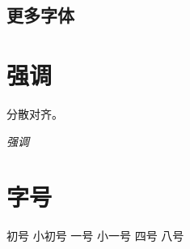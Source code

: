 \documentclass[UTF8]{ctexart}
\begin{document}
        \subsection{更多字体}
        
    \section{强调}
        \begin{CJKfilltwosides}{5cm}
            分散对齐。
        \end{CJKfilltwosides}\newline
        \emph{强调}

    \section{字号}
        { 初号}\newline
        { 小初号}\newline
        { 一号}\newline
        { 小一号}\newline
        { 四号}\newline
        { 八号}\newline
\end{document}
